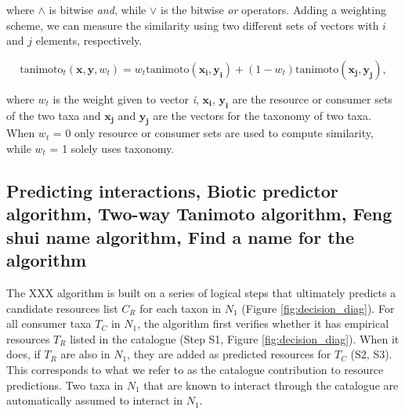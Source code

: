 \documentclass[letterpaper]{article}
\begin{document}
where $\land$ is bitwise \emph{and}, while $\lor$ is the bitwise \emph{or} operators. Adding a weighting scheme, we can measure the similarity using two different sets of vectors with  $i $ and  $j$ elements, respectively.

\begin{equation}
  \mbox{tanimoto}_t(\mathbf{x}, \mathbf{y}, w_t) = w_t\mbox{tanimoto}(\mathbf{x_i}, \mathbf{y_i}) + (1 - w_t)\mbox{tanimoto}(\mathbf{x_j}, \mathbf{y_j}),
\end{equation}

where $w_t$ is the weight given to vector \textit{i}, $\mathbf{x_i}$, $\mathbf{y_i}$ are the resource or consumer sets of the two taxa and $\mathbf{x_j}$ and $\mathbf{y_j}$ are the vectors for the taxonomy of two taxa. When $w_t$ = 0 only resource or consumer sets are used to compute similarity, while $w_t$ = 1 solely uses taxonomy.

  \subsection{Predicting interactions, Biotic predictor algorithm, Two-way Tanimoto algorithm, Feng shui name algorithm, Find a name for the algorithm}

The XXX algorithm is built on a series of logical steps that ultimately predicts a candidate resources list $C_R$ for each taxon in $N_1$ (Figure \ref{fig:decision_diag}). For all consumer taxa $T_C$ in $N_1$, the algorithm first verifies whether it has empirical resources $T_R$ listed in the catalogue (Step S1, Figure \ref{fig:decision_diag}). When it does, if $T_R$ are also in $N_1$, they are added as predicted resources for $T_C$ (S2, S3). This corresponds to what we refer to as the catalogue contribution to resource predictions. Two taxa in $N_1$ that are known to interact through the catalogue are automatically assumed to interact in $N_1$.
\end{document}
